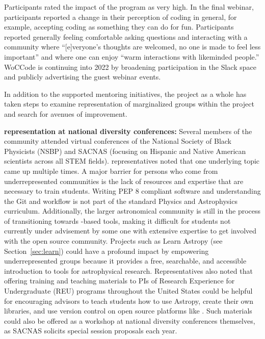 \documentclass[modern]{aastex631}
\begin{document}
Participants rated the impact of the program as very high. In the
final webinar, participants reported a change in their perception of
coding in general, for example, accepting coding as something they can
do for fun. Participants reported generally feeling comfortable asking
questions and interacting with a community where ``[e]veryone's
thoughts are welcomed, no one is made to feel less important'' and
where one can enjoy ``warm interactions with likeminded people.''
WoCCode is continuing into 2022 by broadening participation in the
Slack space and publicly advertising the guest webinar events.

In addition to the supported mentoring initiatives, the \astropy
project as a whole has taken steps to examine representation of
marginalized groups within the project and search for avenues of
improvement.

\textbf{\astropy representation at national diversity conferences:}
Several members of the \astropy community attended virtual conferences of the
National Society of Black Physicists (NSBP) and SACNAS (focusing on Hispanic and
Native American scientists across all STEM fields). \astropy representatives
noted that one underlying topic came up multiple times. A major barrier for
persons who come from underrepresented communities is the lack of resources and
expertise that are necessary to train students. Writing PEP 8 compliant software
and understanding the Git and \github workflow is not part of the standard
Physics and Astrophysics curriculum. Additionally, the larger astronomical
community is still in the process of transitioning towards \python-based tools,
making it difficult for students not currently under advisement by some one with
extensive \python expertise to get involved with the open source \python
community. Projects such as Learn Astropy (see Section~\ref{sec:learn}) could
have a profound impact by empowering underrepresented groups because it provides
a free, searchable, and accessible introduction to \python tools for
astrophysical research. Representatives also noted that offering training and
teaching materials to PIs of Research Experience for Undergraduate (REU)
programs throughout the United States could be helpful for encouraging advisors
to teach students how to use Astropy, create their own libraries, and use
version control on open source platforms like \github. Such materials could also
be offered as a workshop at national diversity conferences themselves, as SACNAS
solicits special session proposals each year.
\end{document}
